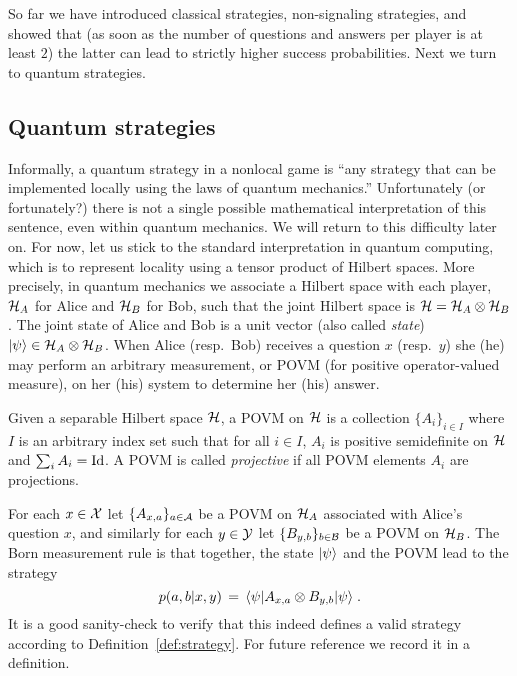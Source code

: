 So far we have introduced classical strategies, non-signaling strategies, and showed that (as soon as the number of questions and answers per player is at least $2$) the latter can lead to strictly higher success probabilities. Next we turn to quantum strategies. 

\subsection{Quantum strategies}

Informally, a quantum strategy in a nonlocal game is ``any strategy that can be implemented locally using the laws of quantum mechanics.'' Unfortunately (or fortunately?) there is not a single possible mathematical interpretation of this sentence, even within quantum mechanics. We will return to this difficulty later on. For now, let us stick to the standard interpretation in quantum computing, which is to represent locality using a tensor product of Hilbert spaces. More precisely, in quantum mechanics we associate a Hilbert space with each player, $\mathcal{H}_A$ for Alice and $\mathcal{H}_B$ for Bob, such that the joint Hilbert space is $\mathcal{H} = \mathcal{H}_A \otimes \mathcal{H}_B$. The joint state of Alice and Bob is a unit vector (also called \emph{state}) $|\psi\rangle \in \mathcal{H}_A \otimes \mathcal{H}_B$. When Alice (resp.\ Bob) receives a question $x$ (resp.\ $y$) she (he) may perform an arbitrary measurement, or POVM (for positive operator-valued measure), on her (his) system to determine her (his) answer. 

\begin{definition}
Given a separable Hilbert space $\mathcal{H}$, a POVM on $\mathcal{H}$ is a collection $\{A_i\}_{i\in I}$ where $I$ is an arbitrary index set such that for all $i\in I$, $A_i$ is positive semidefinite on $\mathcal{H}$ and $\sum_i A_i=\mathop{\rm Id}\nolimits$. A POVM is called \emph{projective} if all POVM elements $A_i$ are projections. 
\end{definition}

For each $x\in \mathcal{X}$ let $\{A_{x,a}\}_{a\in\mathcal{A}}$ be a POVM on $\mathcal{H}_A$ associated with Alice's question $x$, and similarly for each $y\in \mathcal{Y}$ let $\{B_{y,b}\}_{b\in\mathcal{B}}$ be a POVM on $\mathcal{H}_B$. The Born measurement rule is that together, the state $|\psi\rangle$ and the POVM lead to the strategy 
\begin{equation}\label{eq:p-quant}
p(a,b|x,y) \,=\, \langle\psi| A_{x,a} \otimes B_{y,b} |\psi\rangle\;.
\end{equation}
It is a good sanity-check to verify that this indeed defines a valid strategy according to Definition~\ref{def:strategy}. For future reference we record it in a definition. 


